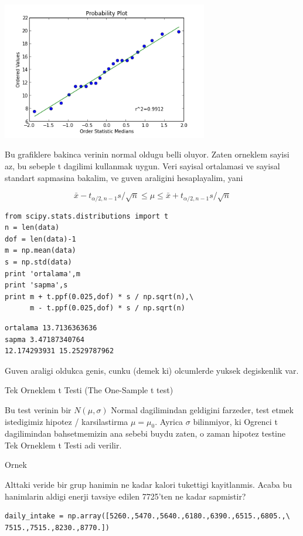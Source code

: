 \documentclass[12pt,fleqn]{article}\usepackage{../common}
\begin{document}
\includegraphics[height=6cm]{stat_sampling_dist_02.png}

Bu grafiklere bakinca verinin normal oldugu belli oluyor. Zaten orneklem
sayisi az, bu sebeple t dagilimi kullanmak uygun. Veri sayisal ortalamasi
ve sayisal standart sapmasina bakalim, ve guven araligini hesaplayalim, 
yani

$$ \bar{x} - t_{\alpha/2,n-1}s/\sqrt{n} \le
\mu \le
 \bar{x} + t_{\alpha/2,n-1}s/\sqrt{n}
$$

\begin{verbatim}
from scipy.stats.distributions import t
n = len(data)
dof = len(data)-1
m = np.mean(data)
s = np.std(data)
print 'ortalama',m
print 'sapma',s
print m + t.ppf(0.025,dof) * s / np.sqrt(n),\
      m - t.ppf(0.025,dof) * s / np.sqrt(n)
\end{verbatim}

\begin{verbatim}
ortalama 13.7136363636
sapma 3.47187340764
12.174293931 15.2529787962
\end{verbatim}

Guven araligi oldukca genis, cunku (demek ki) olcumlerde yuksek degiskenlik
var. 

Tek Orneklem t Testi (The One-Sample t test)

Bu test verinin bir $N(\mu,\sigma)$ Normal dagilimindan geldigini farzeder,
test etmek istedigimiz hipotez / karsilastirma $\mu = \mu_0$. Ayrica
$\sigma$ bilinmiyor, ki Ogrenci t dagilimindan bahsetmemizin ana sebebi
buydu zaten, o zaman hipotez testine Tek Orneklem t Testi adi verilir.

Ornek

Alttaki veride bir grup hanimin ne kadar kalori tukettigi
kayitlanmis. Acaba bu hanimlarin aldigi enerji tavsiye edilen 7725'ten ne
kadar sapmistir?

\begin{verbatim}
daily_intake = np.array([5260.,5470.,5640.,6180.,6390.,6515.,6805.,\
7515.,7515.,8230.,8770.])
\end{verbatim}
\end{document}
